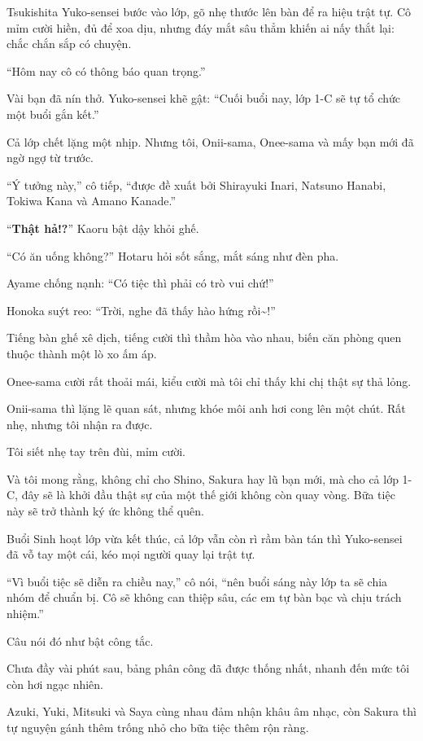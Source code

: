 \documentclass[../main.tex]{subfiles}
\begin{document}
Tsukishita Yuko-sensei bước vào lớp, gõ nhẹ thước lên bàn để ra hiệu trật tự. Cô mỉm cười hiền, đủ để xoa dịu, nhưng đáy mắt sâu thẳm khiến ai nấy thắt lại: chắc chắn sắp có chuyện.

``Hôm nay cô có thông báo quan trọng.''

Vài bạn đã nín thở. Yuko-sensei khẽ gật: ``Cuối buổi nay, lớp 1-C sẽ tự tổ chức một buổi gắn kết.''

Cả lớp chết lặng một nhịp. Nhưng tôi, Onii-sama, Onee-sama và mấy bạn mới đã ngờ ngợ từ trước.

``Ý tưởng này,'' cô tiếp, ``được đề xuất bởi Shirayuki Inari, Natsuno Hanabi, Tokiwa Kana và Amano Kanade.''

``\textbf{Thật hả!?}'' Kaoru bật dậy khỏi ghế.

``Có ăn uống không?'' Hotaru hỏi sốt sắng, mắt sáng như đèn pha.

Ayame chống nạnh: ``Có tiệc thì phải có trò vui chứ!''

Honoka suýt reo: ``Trời, nghe đã thấy hào hứng rồi\~{}!''

Tiếng bàn ghế xê dịch, tiếng cười thì thầm hòa vào nhau, biến căn phòng quen thuộc thành một lò xo ấm áp.

Onee-sama cười rất thoải mái, kiểu cười mà tôi chỉ thấy khi chị thật sự thả lỏng.

Onii-sama thì lặng lẽ quan sát, nhưng khóe môi anh hơi cong lên một chút. Rất nhẹ, nhưng tôi nhận ra được.

Tôi siết nhẹ tay trên đùi, mỉm cười.

Và tôi mong rằng, không chỉ cho Shino, Sakura hay lũ bạn mới, mà cho cả lớp 1-C, đây sẽ là khởi đầu thật sự của một thế giới không còn quay vòng. Bữa tiệc này sẽ trở thành ký ức không thể quên.

\ct

Buổi Sinh hoạt lớp vừa kết thúc, cả lớp vẫn còn rì rầm bàn tán thì Yuko-sensei đã vỗ tay một cái, kéo mọi người quay lại trật tự.

``Vì buổi tiệc sẽ diễn ra chiều nay,'' cô nói, ``nên buổi sáng này lớp ta sẽ chia nhóm để chuẩn bị. Cô sẽ không can thiệp sâu, các em tự bàn bạc và chịu trách nhiệm.''

Câu nói đó như bật công tắc.

Chưa đầy vài phút sau, bảng phân công đã được thống nhất, nhanh đến mức tôi còn hơi ngạc nhiên.

Azuki, Yuki, Mitsuki và Saya cùng nhau đảm nhận khâu âm nhạc, còn Sakura thì tự nguyện gánh thêm trống nhỏ cho bữa tiệc thêm rộn ràng.
\end{document}
